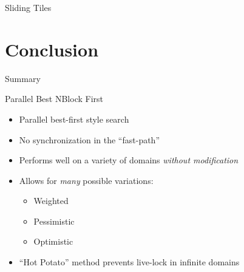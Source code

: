 \documentclass[style=unh]{powerdot}
\begin{document}

\begin{slide}{Sliding Tiles}
\end{slide}


\section{Conclusion}


\begin{slide}{Summary}
  \begin{center}
    Parallel Best NBlock First
  \end{center}
  \begin{itemize}
  \item Parallel best-first style search
  \item No synchronization in the ``fast-path''
  \item Performs well on a variety of domains \emph{without modification}
  \item Allows for \emph{many} possible variations:
    \begin{itemize}
    \item Weighted
    \item Pessimistic
    \item Optimistic
    \end{itemize}
  \item ``Hot Potato'' method prevents live-lock in infinite domains
  \end{itemize}
\end{slide}
\end{document}
